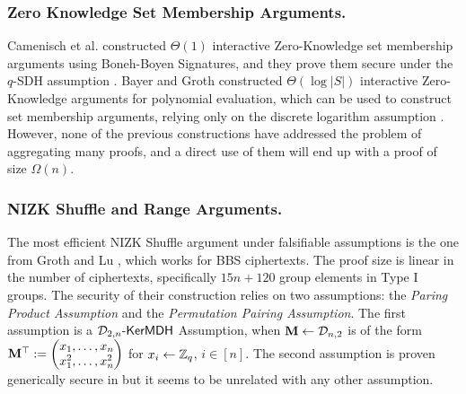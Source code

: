 \subsubsection{Zero Knowledge Set Membership Arguments.}
Camenisch et al. constructed $\Theta(1)$ interactive Zero-Knowledge set membership arguments using Boneh-Boyen Signatures, and they prove them secure under the $q$-SDH assumption \cite{AC:CamChaShe08}. Bayer and Groth constructed $\Theta(\log |S|)$ interactive Zero-Knowledge arguments for polynomial evaluation, which can be used to construct set membership arguments, relying only on the discrete logarithm assumption \cite{EC:BayGro13}.
However, none of the previous constructions have addressed the problem of aggregating many proofs, and a direct use of them will end up with a proof of size $\Omega(n)$.

%

\subsubsection{NIZK Shuffle and Range Arguments.}
The most efficient NIZK Shuffle argument under falsifiable assumptions is the one from Groth and Lu \cite{AC:GroLu07}, which works for BBS ciphertexts. The proof size is linear in the number of ciphertexts, specifically $15n + 120$ group elements in Type I groups. The security of their construction relies on two assumptions: the \emph{Paring Product Assumption} and the \emph{Permutation Pairing Assumption}. The first assumption is a $\mathcal{D}_{2,n}\mbox{-}\mathsf{KerMDH}$ Assumption, when $\mathbf{{M}}\gets\mathcal{D}_{n,2}$ is of the form $\mathbf{{M}}^\top:=\left(\begin{matrix}x_1,\ldots,x_n\\x_1^2,\ldots,x_n^2\end{matrix}\right)$ for $x_i\gets\mathbb{Z}_q$, $i\in[n]$. The second assumption is proven generically secure in \cite{AC:GroLu07} but it seems to be unrelated with any other assumption.

